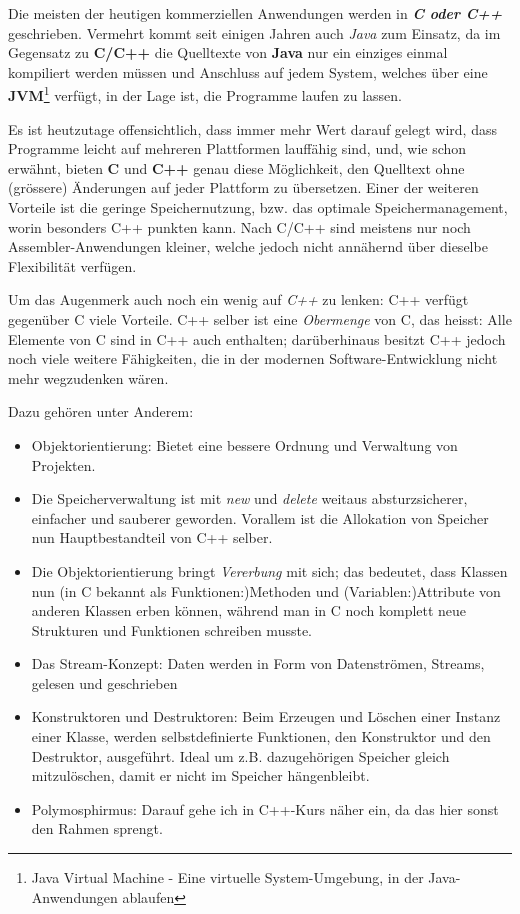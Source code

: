 \documentclass[a4paper,10pt,dvips,fleqn,titlepage,twoside]{book}
\begin{document}
Die meisten der heutigen kommerziellen Anwendungen werden in \emph{\textbf{C oder C++}} geschrieben. Vermehrt kommt seit einigen Jahren auch \emph{Java} zum Einsatz, da im Gegensatz zu \textbf{C/C++} die Quelltexte von \textbf{Java} nur ein einziges einmal kompiliert werden müssen und Anschluss auf jedem System, welches über eine \textbf{\textbf{JVM}}\footnote{Java Virtual Machine - Eine virtuelle System-Umgebung, in der Java-Anwendungen ablaufen} verfügt, in der Lage ist, die Programme laufen zu lassen.

Es ist heutzutage offensichtlich, dass immer mehr Wert darauf gelegt wird, dass Programme leicht auf mehreren Plattformen lauffähig sind, und, wie schon erwähnt, bieten \textbf{C} und \textbf{C++} genau diese Möglichkeit, den Quelltext ohne (grössere) Änderungen auf jeder Plattform zu übersetzen. Einer der weiteren Vorteile ist die geringe Speichernutzung, bzw. das optimale Speichermanagement, worin besonders C++ punkten kann. Nach C/C++ sind meistens nur noch Assembler-Anwendungen kleiner, welche jedoch nicht annähernd über dieselbe Flexibilität verfügen.

Um das Augenmerk auch noch ein wenig auf \emph{C++} zu lenken: C++ verfügt gegenüber C viele Vorteile. C++ selber ist eine \emph{Obermenge} von C, das heisst: Alle Elemente von C sind in C++ auch enthalten; darüberhinaus besitzt C++ jedoch noch viele weitere Fähigkeiten, die in der modernen Software-Entwicklung nicht mehr wegzudenken wären.

Dazu gehören unter Anderem:\newline

\begin{itemize}
 \item Objektorientierung: Bietet eine bessere Ordnung und Verwaltung von Projekten.
\item Die Speicherverwaltung ist mit \emph{new} und \emph{delete} weitaus absturzsicherer, einfacher und sauberer geworden. Vorallem ist die Allokation von Speicher nun Hauptbestandteil von C++ selber.
\item Die Objektorientierung bringt \emph{Vererbung} mit sich; das bedeutet, dass Klassen nun (in C bekannt als Funktionen:)Methoden und (Variablen:)Attribute von anderen Klassen erben können, während man in C noch komplett neue Strukturen und Funktionen schreiben musste.
\item Das Stream-Konzept: Daten werden in Form von Datenströmen, Streams, gelesen und geschrieben
\item Konstruktoren und Destruktoren: Beim Erzeugen und Löschen einer Instanz einer Klasse, werden selbstdefinierte Funktionen, den Konstruktor und den Destruktor, ausgeführt. Ideal um z.B. dazugehörigen Speicher gleich mitzulöschen, damit er nicht im Speicher hängenbleibt.
\item Polymosphirmus: Darauf gehe ich in C++-Kurs näher ein, da das hier sonst den Rahmen sprengt.
\end{itemize}
\end{document}
